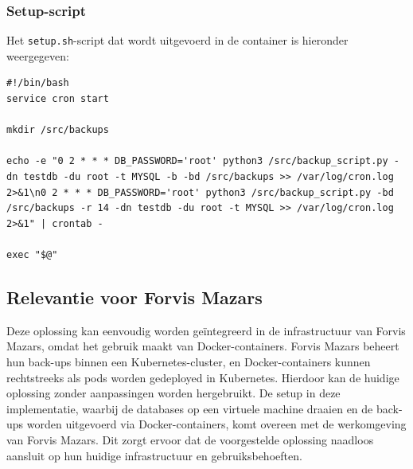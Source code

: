\subsubsection*{Setup-script}
Het \texttt{setup.sh}-script dat wordt uitgevoerd in de container is hieronder weergegeven:
\begin{lstlisting}[language=script, caption=Setup-script voor het configureren van cronjobs]
#!/bin/bash
service cron start

mkdir /src/backups

echo -e "0 2 * * * DB_PASSWORD='root' python3 /src/backup_script.py -dn testdb -du root -t MYSQL -b -bd /src/backups >> /var/log/cron.log 2>&1\n0 2 * * * DB_PASSWORD='root' python3 /src/backup_script.py -bd /src/backups -r 14 -dn testdb -du root -t MYSQL >> /var/log/cron.log 2>&1" | crontab -

exec "$@"
\end{lstlisting}

\subsection{Relevantie voor Forvis Mazars}
Deze oplossing kan eenvoudig worden geïntegreerd in de infrastructuur van Forvis Mazars, omdat het gebruik maakt van Docker-containers. Forvis Mazars beheert hun back-ups binnen een Kubernetes-cluster, en Docker-containers kunnen rechtstreeks als pods worden gedeployed in Kubernetes. Hierdoor kan de huidige oplossing zonder aanpassingen worden hergebruikt. De setup in deze implementatie, waarbij de databases op een virtuele machine draaien en de back-ups worden uitgevoerd via Docker-containers, komt overeen met de werkomgeving van Forvis Mazars. Dit zorgt ervoor dat de voorgestelde oplossing naadloos aansluit op hun huidige infrastructuur en gebruiksbehoeften.



































